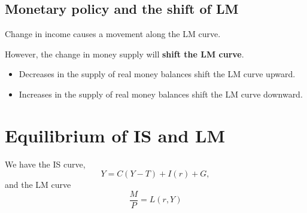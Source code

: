 \documentclass[10pt]{article}
\begin{document}
\begin{figure}[H]
\end{figure}



\subsection{Monetary policy and the shift of LM}
Change in income causes a movement along the LM curve.

However, the change in money supply will {\textbf {shift the LM curve}}.

\begin{figure}[H]
\end{figure}


\begin{itemize}
\item Decreases in the supply of real money balances shift the LM curve upward.
\item Increases in the supply of real money balances shift the LM curve downward.
\end{itemize}





\section{Equilibrium of IS and LM}
We have the IS curve,
\begin{equation*}
Y = C(Y - T) + I(r) + G,
\end{equation*}
and the LM curve
\begin{equation*}
\frac{M}{P} = L(r, Y)
\end{equation*}
\end{document}
